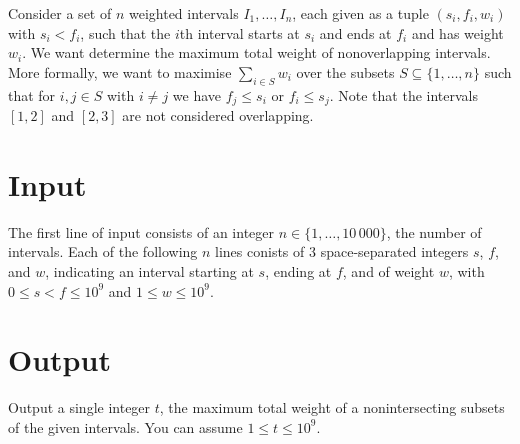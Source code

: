 
Consider a set of $n$ weighted intervals $I_1,\ldots, I_n$, each given as a tuple $(s_i, f_i, w_i)$ with $s_i<f_i$, such that the $i$th interval starts at $s_i$ and ends at $f_i$ and has weight $w_i$.
We want determine the maximum total weight of nonoverlapping intervals.
More formally, we want to maximise $\sum_{i\in S} w_i$ over the subsets $S\subseteq \{1,\ldots,n\}$ such that for $i, j\in S$ with $i\neq j$ we have $f_j \leq s_i$ or $f_i\leq s_j$. 
Note that the intervals $[1,2]$ and $[2,3]$ are not considered overlapping.

\section*{Input}

The first line of input consists of an integer $n\in\{1,\ldots, 10\,000\}$, the number of intervals.
Each of the following $n$ lines conists of 3 space-separated integers $s$, $f$, and $w$, indicating an interval starting at $s$, ending at $f$, and of weight $w$, with $0\leq s<f\leq 10^9$ and $1\leq w\leq 10^9$.


\section*{Output}

Output a single integer $t$, the maximum total weight of a nonintersecting subsets of the given intervals.
You can assume  $1\leq t\leq 10^9$.
